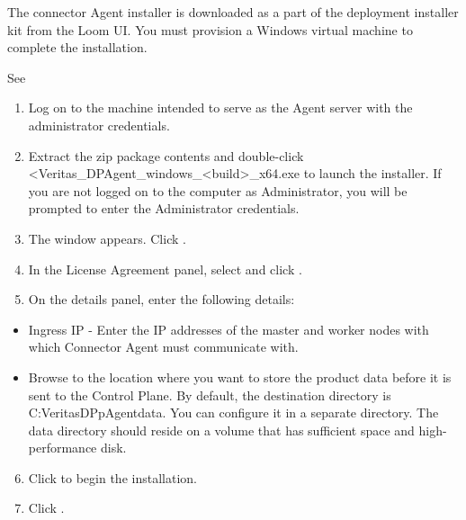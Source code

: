 \documentclass[letterpaper,10pt,english]{sphinxmanual}
\begin{document}
The connector Agent installer is downloaded as a part of the deployment installer kit from the Loom UI. You must provision a Windows virtual machine to complete
the installation.

See {\hyperref[\detokenize{on_prem_dp_install_mcdmp:sys-req}]{}}

\begin{enumerate}
\item {} 
Log on to the machine intended to serve as the Agent server with the administrator credentials.

\item {} 
Extract the zip package contents and double-click \textless{}Veritas\_DPAgent\_windows\_\textless{}build\textgreater{}\_x64.exe to launch the installer. If you are not logged on to the computer as Administrator, you will be prompted to enter the Administrator credentials.

\item {} 
The  window appears. Click .

\item {} 
In the License Agreement panel, select  and click .

\item {} 
On the  details panel, enter the following details:

\end{enumerate}
\begin{itemize}
\item {} 
Ingress IP  - Enter the IP addresses of the master and worker nodes with which Connector Agent must communicate with.

\item {} 
Browse to the location where you want to store the product data before it is sent to the Control Plane. By default, the destination directory is C:VeritasDPpAgentdata. You can configure it in a separate directory.
The data directory should reside on a volume that has sufficient space and high-performance disk.

\end{itemize}
\begin{enumerate}
\setcounter{enumi}{5}
\item {} 
Click  to begin the installation.

\item {} 
Click .

\end{enumerate}
\end{document}
